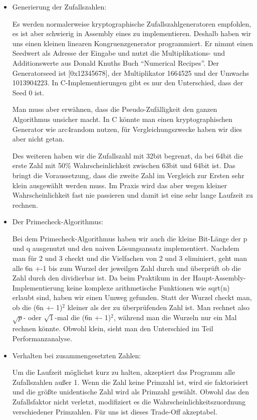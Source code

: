 \documentclass[course=asp]{aspdoc}
\begin{document}
\begin{itemize}
\item 
Generierung der Zufallszahlen:

Es werden normalerweise kryptographische Zufallszahlgeneratoren empfohlen, es ist aber schwierig in Assembly eines zu implementieren. Deshalb haben wir uns einen kleinen linearen Kongruenzgenerator programmiert. Er nimmt einen Seedwert als Adresse der Eingabe und nutzt die Multiplikations- und Additionswerte aus Donald Knuths Buch “Numerical Recipes”. Der Generatorseed ist [0x12345678], der Multiplikator 1664525 und der Umwachs 1013904223. In C-Implementierungen gibt es nur den Unterschied, dass der Seed 0 ist.

Man muss aber erwähnen, dass die Pseudo-Zufälligkeit den ganzen Algorithmus unsicher macht. In C könnte man einen kryptographischen Generator wie arc4random nutzen, für Vergleichungszwecke haben wir dies aber nicht getan.

Des weiteren haben wir die Zufallszahl mit 32bit begrenzt, da bei 64bit die erste Zahl mit 50\% Wahrscheinlichkeit zwischen 63bit und 64bit ist. Das bringt die Voraussetzung, dass die zweite Zahl im Vergleich zur Ersten sehr klein ausgewählt werden muss. Im Praxis wird das aber wegen kleiner Wahrscheinlichkeit fast nie passieren und damit ist eine sehr lange Laufzeit zu rechnen.

\item 
Der Primecheck-Algorithmus:

Bei dem Primecheck-Algorithmus haben wir auch die kleine Bit-Länge der p und q ausgenutzt und den naiven Lösungsansatz implementiert. Nachdem man für 2 und 3 checkt und die Vielfachen von 2 und 3 eliminiert, geht man alle 6n +-1 bis zum Wurzel der jeweilgen Zahl durch und überprüft ob die Zahl durch den dividierbar ist. Da beim Praktikum in der Haupt-Assembly-Implementierung keine komplexe arithmetische Funktionen wie sqrt(n) erlaubt sind, haben wir einen Umweg gefunden. Statt der Wurzel checkt man, ob die (6n +- 1)$^{2}$ kleiner als der zu überprüfenden Zahl ist. Man rechnet also $\sqrt{p}$- oder $\sqrt{1}$-mal die (6n +- 1)$^{2}$, während man die Wurzeln nur ein Mal rechnen könnte. Obwohl klein, sieht man den Unterschied im Teil Performanzanalyse.

\item 
Verhalten bei zusammengesetzten Zahlen:
	
Um die Laufzeit möglichst kurz zu halten, akzeptiert das Programm alle Zufallszahlen außer 1. Wenn die Zahl keine Primzahl ist, wird sie faktorisiert und die größte unidentische Zahl wird als Primzahl gewählt. Obwohl das den Zufallsfaktor nicht verletzt, modifiziert es die Wahrscheinlichkeitszuordnung verschiedener Primzahlen. Für uns ist dieses Trade-Off akzeptabel.
\end{itemize}
\end{document}
